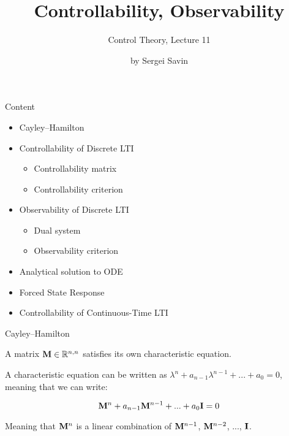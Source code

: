 \documentclass{beamer}
\title{Controllability, Observability}
\subtitle{Control Theory, Lecture 11}
\author{by Sergei Savin}
\date{\mydate}
\begin{document}
\maketitle


\begin{frame}{Content}
\begin{itemize}
\item Cayley–Hamilton
\item Controllability of Discrete LTI
\begin{itemize}
    \item Controllability matrix
    \item Controllability criterion
\end{itemize}
\item Observability of Discrete LTI
\begin{itemize}
    \item Dual system
    \item Observability criterion
\end{itemize}
\item Analytical solution to ODE
\item Forced State Response
\item Controllability of Continuous-Time LTI
\end{itemize}
\end{frame}





\begin{frame}{Cayley–Hamilton}
	\begin{flushleft}
		
		\begin{theorem}
			A matrix $\mathbf{M} \in \mathbb{R}^{n, n}$ satisfies its own characteristic equation.
		\end{theorem}
		
		A characteristic equation can be written as $\lambda^n + a_{n-1}\lambda^{n-1} + ... + a_0  = 0$, meaning that we can write:
		
		\begin{equation}
			\mathbf{M}^n + a_{n-1}\mathbf{M}^{n-1} + ... + a_0\mathbf{I}  = 0
		\end{equation}	
		
		Meaning that $\mathbf{M}^n$ is a linear combination of $\mathbf{M}^{n-1}$, $\mathbf{M}^{n-2}$, ..., $\mathbf{I}$.
		
		
	\end{flushleft}
\end{frame}
\end{document}
